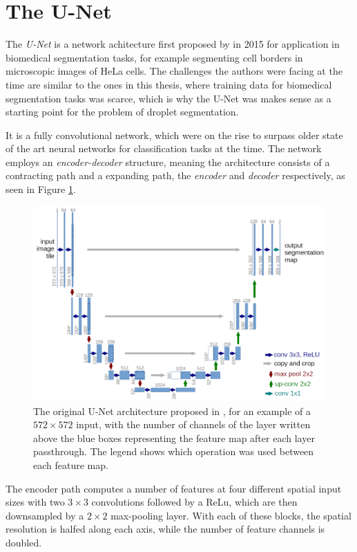 \section{The U-Net}

The \emph{U-Net} is a network achitecture first proposed by  in 2015 for application in biomedical segmentation tasks, for example segmenting cell borders in microscopic images of HeLa cells. 
The challenges the authors were facing at the time are similar to the ones in this thesis, where training data for biomedical segmentation tasks was scarce, which is why the U-Net was makes sense as a starting point for the problem of droplet segmentation.

It is a fully convolutional network, which were on the rise to surpass older state of the art neural networks for classification tasks at the time. 
The network employs an \emph{encoder-decoder} structure, meaning the architecture consists of a contracting path and a expanding path, the \emph{encoder} and \emph{decoder} respectively, as seen in Figure \ref{fig:unet}.

\begin{figure}[htbp]
    \includegraphics[width=\textwidth]{images/unet.png}
    \caption{The original U-Net architecture proposed in \cite{ronnebergerUNetConvolutionalNetworks2015}, for an example of a $572\times 572$ input, with the number of channels of the layer written above the blue boxes representing the feature map after each layer passthrough. The legend shows which operation was used between each feature map.}
    \label{fig:unet}
\end{figure}

The encoder path computes a number of features at four different spatial input sizes with two $3\times 3$ convolutions followed by a ReLu, which are then downsampled by a $2\times 2$ max-pooling layer. 
With each of these blocks, the spatial resolution is halfed along each axis, while the number of feature channels is doubled.

